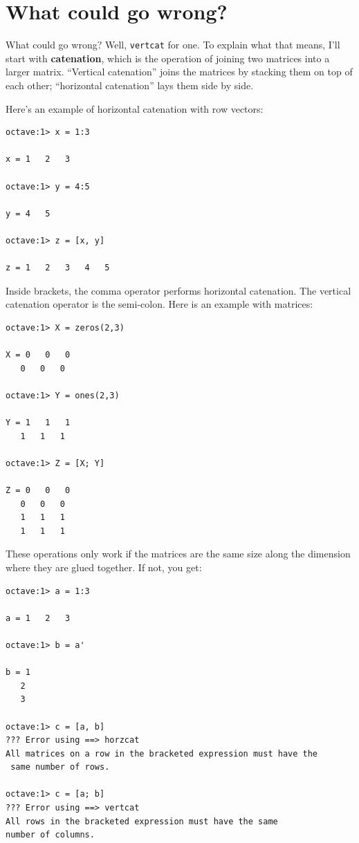 \documentclass{book}
\begin{document}
\section{What could go wrong?}

What could go wrong? Well, {\tt vertcat} for one. To explain
what that means, I'll start with {\bf catenation}, which is
the operation of joining two matrices into a larger matrix.
``Vertical catenation'' joins the matrices by stacking them on
top of each other; ``horizontal catenation'' lays them
side by side.

Here's an example of horizontal catenation with row vectors:

\begin{verbatim}
octave:1> x = 1:3

x = 1   2   3

octave:1> y = 4:5

y = 4   5

octave:1> z = [x, y]

z = 1   2   3   4   5
\end{verbatim}

Inside brackets, the comma operator performs horizontal catenation.
The vertical catenation operator is the semi-colon. Here is an
example with matrices:

\begin{verbatim}
octave:1> X = zeros(2,3)

X = 0   0   0
   0   0   0

octave:1> Y = ones(2,3)

Y = 1   1   1
   1   1   1

octave:1> Z = [X; Y]

Z = 0   0   0
   0   0   0
   1   1   1
   1   1   1
\end{verbatim}

These operations only work if the matrices are the same size along
the dimension where they are glued together. If not, you get:

\begin{verbatim}
octave:1> a = 1:3

a = 1   2   3

octave:1> b = a'

b = 1
   2
   3

octave:1> c = [a, b]
??? Error using ==> horzcat
All matrices on a row in the bracketed expression must have the 
 same number of rows.

octave:1> c = [a; b]
??? Error using ==> vertcat
All rows in the bracketed expression must have the same 
number of columns.
\end{verbatim}
\end{document}
